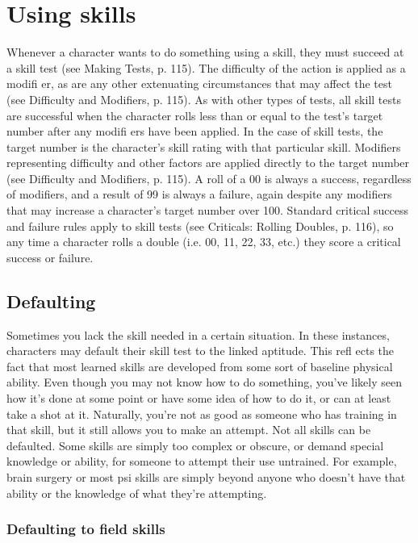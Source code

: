\section{Using skills}
\label{sec:usingskills}

Whenever a character wants to do something using a skill, they must succeed at a skill test (see Making Tests, p. 115). The difficulty of the action is applied as a modifi er, as are any other extenuating circumstances that may affect the test (see Difficulty and Modifiers, p. 115). As with other types of tests, all skill tests are successful when the character rolls less than or equal to the test’s target number after any modifi ers have been applied. In the case of skill tests, the target number is the character’s skill rating with that particular skill. Modifiers representing difficulty and other factors are applied directly to the target number (see Difficulty and Modifiers, p. 115). A roll of a 00 is always a success, regardless of modifiers, and a result of 99 is always a failure, again despite any modifiers that may increase a character’s target number over 100. Standard critical success and failure rules apply to skill tests (see Criticals: Rolling Doubles, p. 116), so any time a character rolls a double (i.e. 00, 11, 22, 33, etc.) they score a critical success or failure.


\subsection{Defaulting}
\label{sec:defaulting}

Sometimes you lack the skill needed in a certain situation. In these instances, characters may default their skill test to the linked aptitude. This refl ects the fact that most learned skills are developed from some sort of baseline physical ability. Even though you may not know how to do something, you’ve likely seen how it’s done at some point or have some idea of how to do it, or can at least take a shot at it. Naturally, you’re not as good as someone who has training in that skill, but it still allows you to make an attempt. Not all skills can be defaulted. Some skills are simply too complex or obscure, or demand special knowledge or ability, for someone to attempt their use untrained. For example, brain surgery or most psi skills are simply beyond anyone who doesn’t have that ability or the knowledge of what they’re attempting.


\subsubsection{Defaulting to field skills}
\label{sec:defaultingtofieldskills}

